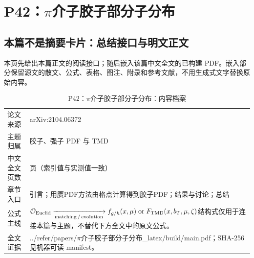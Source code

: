 \documentclass[UTF8,11pt,oneside]{ctexbook}
\begin{document}
\chapter{P42：$\pi$介子胶子部分子分布}
\section*{本篇不是摘要卡片：总结接口与明文正文}
本页先给出本篇正文的阅读接口；随后嵌入该篇中文全文的已构建 PDF。嵌入部分保留源文的散文、公式、表格、图注、附录和参考文献，不用生成式文字替换原始内容。
\begin{table}[htbp]
  \centering
  \caption{P42：$\pi$介子胶子部分子分布：内容档案}
  \small
  \begin{tabularx}{0.96\textwidth}{@{}p{3.3cm}>{\raggedright\arraybackslash}X@{}}
    \toprule
    论文来源 & arXiv:2104.06372 \\
    主题归属 & 胶子、强子 PDF 与 TMD \\
    中文全文页数 & 17 页（索引值与实测值一致） \\
    章节入口 & 引言；用赝PDF方法由格点计算得到胶子PDF；结果与讨论；总结 \\
    公式主线 & $\mathcal O_{\rm Euclid}\xrightarrow[\rm matching\,/\,evolution]{}f_{g/h}(x,\mu)\;{\rm or}\;F_{\rm TMD}(x,b_T,\mu,\zeta)$\newline\scriptsize 结构式仅用于连接本篇与主题，不替代下方全文中的原文公式。 \\
    全文证据 & ../\allowbreak{}refer/\allowbreak{}papers/\allowbreak{}$\pi$介子胶子部分子分布\_\allowbreak{}latex/\allowbreak{}build/\allowbreak{}main.pdf；SHA-256 见机器可读 manifest。 \\
    \bottomrule
  \end{tabularx}
\end{table}
\end{document}
